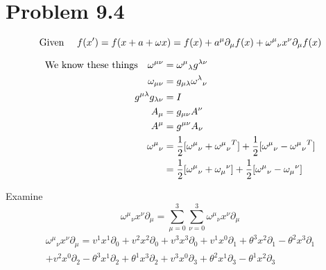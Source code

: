 \documentclass{article}
\begin{document}
\section*{Problem 9.4}

\[\qq*{Given } f(x^\prime) = f(x+a+\omega x) = f(x)+a^\mu \partial_\mu f(x)+{\omega^\mu}_\nu x^\nu \partial_\mu f(x)\]

\begin{align*}
	\qq*{We know these things}\omega^{\mu\nu}&={\omega^\mu}_\lambda g^{\lambda\nu}\\
	\omega_{\mu\nu}&= g_{\mu\lambda} {\omega^\lambda}_\nu\\
	g^{\mu\lambda}g_{\lambda\nu}&= I\\
	A_\mu&=g_{\mu\nu}A^\nu\\
	A^\mu&=g^{\mu\nu}A_\nu\\
	{\omega^\mu}_\nu&=\frac{1}{2}[{\omega^\mu}_\nu+{{\omega^\mu}_\nu}^T]+\frac{1}{2}[{\omega^\mu}_\nu-{{\omega^\mu}_\nu}^T]\\
	&=\frac{1}{2}[{\omega^\mu}_\nu+{\omega_\mu}^\nu]+\frac{1}{2}[{\omega^\mu}_\nu-{\omega_\mu}^\nu]
\end{align*}




Examine \[{\omega^\mu}_\nu x^\nu \partial_\mu=\sum^3_{\mu=0}\sum^3_{\nu=0}{\omega^\mu}_\nu x^\nu \partial_\mu\]
\begin{multline*}
{\omega^\mu}_\nu x^\nu \partial_\mu=
v^1 x^1 \partial_0+v^2 x^2 \partial_0+v^3 x^3 \partial_0+
v^1 x^0 \partial_1+\theta^3 x^2 \partial_1-\theta^2 x^3 \partial_1\\+ 
v^2 x^0 \partial_2-\theta^3 x^1 \partial_2+\theta^1 x^3 \partial_2+
v^3 x^0 \partial_3+\theta^2 x^1 \partial_3-\theta^1 x^2 \partial_3
\end{multline*}
\end{document}
